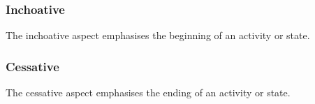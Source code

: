 \documentclass[grammar]{subfiles}
\begin{document}
  \subsubsection{Inchoative}
  \label{vm:sssec_inchoative}

  The inchoative aspect emphasises the beginning of an activity or state.

  
  \subsubsection{Cessative}
  \label{vm:sssec_cessative}

  The cessative aspect emphasises the ending of an activity or state.

  
%  
%


\end{document}
